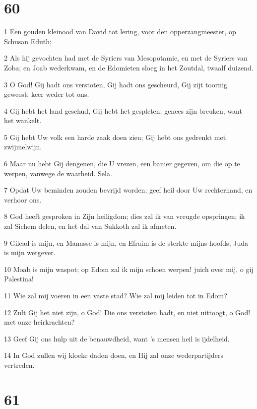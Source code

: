 \chapter{60}

\par 1 Een gouden kleinood van David tot lering, voor den opperzangmeester, op Schusan Eduth;
\par 2 Als hij gevochten had met de Syriers van Mesopotamie, en met de Syriers van Zoba; en Joab wederkwam, en de Edomieten sloeg in het Zoutdal, twaalf duizend.
\par 3 O God! Gij hadt ons verstoten, Gij hadt ons gescheurd, Gij zijt toornig geweest; keer weder tot ons.
\par 4 Gij hebt het land geschud, Gij hebt het gespleten; genees zijn breuken, want het wankelt.
\par 5 Gij hebt Uw volk een harde zaak doen zien; Gij hebt ons gedrenkt met zwijmelwijn.
\par 6 Maar nu hebt Gij dengenen, die U vrezen, een banier gegeven, om die op te werpen, vanwege de waarheid. Sela.
\par 7 Opdat Uw beminden zouden bevrijd worden; geef heil door Uw rechterhand, en verhoor ons.
\par 8 God heeft gesproken in Zijn heiligdom; dies zal ik van vreugde opspringen; ik zal Sichem delen, en het dal van Sukkoth zal ik afmeten.
\par 9 Gilead is mijn, en Manasse is mijn, en Efraim is de sterkte mijns hoofds; Juda is mijn wetgever.
\par 10 Moab is mijn waspot; op Edom zal ik mijn schoen werpen! juich over mij, o gij Palestina!
\par 11 Wie zal mij voeren in een vaste stad? Wie zal mij leiden tot in Edom?
\par 12 Zult Gij het niet zijn, o God! Die ons verstoten hadt, en niet uittoogt, o God! met onze heirkrachten?
\par 13 Geef Gij ons hulp uit de benauwdheid, want 's mensen heil is ijdelheid.
\par 14 In God zullen wij kloeke daden doen, en Hij zal onze wederpartijders vertreden.

\chapter{61}

